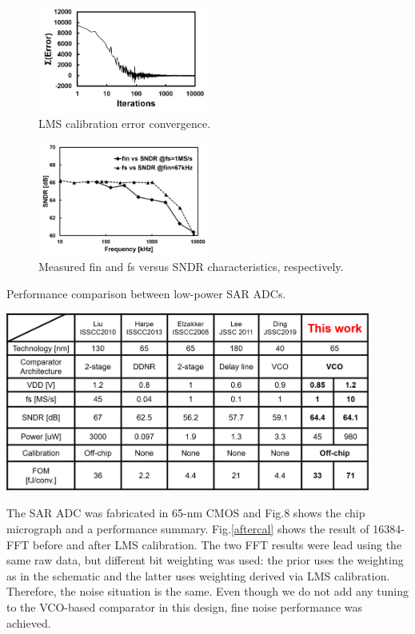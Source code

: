 \documentclass[letterpaper, 10 pt, conference]{ieeeconf}  %
\begin{document}
\begin{figure}[ht!]
\centering
 \includegraphics[width=0.5\textwidth]{figs/lms.png}
  \captionsetup{font=footnotesize}
  \caption{LMS calibration error convergence.}
  \label{lms}
\end{figure}

\begin{figure}[ht!]
\centering
 \includegraphics[width=0.5\textwidth]{figs/freq-sndr.png}
  \captionsetup{font=footnotesize}
  \caption{Measured fin and fs versus SNDR characteristics, respectively.}
  \label{freqvssndr}
\end{figure}

\begin{table}[ht!]
\centering
 \caption{Performance comparison between low-power SAR ADCs.}
 \includegraphics[width=0.9\textwidth]{figs/table.png}
  \captionsetup{font=footnotesize}
  \label{performancecomp}
\end{table}

The SAR ADC was fabricated in 65-nm CMOS and Fig.8 shows the chip micrograph and a performance summary. 
Fig.\ref{aftercal} shows the result of 16384-FFT before and after LMS calibration. The two FFT results were lead using the same raw data, but different bit weighting was used: the prior uses the weighting as in the schematic and the latter uses weighting derived via LMS calibration. Therefore, the noise situation is the same. Even though we do not add any tuning to the VCO-based comparator in this design, fine noise performance was achieved. 
\end{document}
